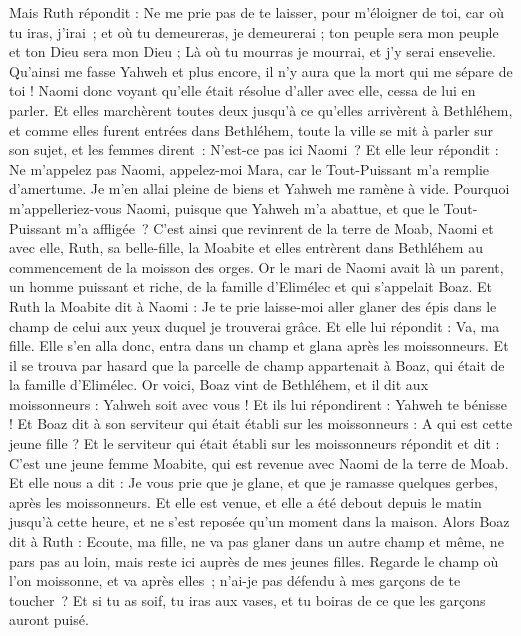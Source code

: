 \begin{multicols}{2}
Mais Ruth répondit : Ne me prie pas de te laisser, pour m’éloigner de toi, car où tu iras, j’irai ; et où tu demeureras, je demeurerai ; ton peuple sera mon peuple et ton Dieu sera mon Dieu ;
Là où tu mourras je mourrai, et j'y serai ensevelie. Qu'ainsi me fasse Yahweh et plus encore, il n’y aura que la mort qui me sépare de toi !
Naomi donc voyant qu’elle était résolue d’aller avec elle, cessa de lui en parler.
Et elles marchèrent toutes deux jusqu'à ce qu'elles arrivèrent à Bethléhem, et comme elles furent entrées dans Bethléhem, toute la ville se mit à parler sur son sujet, et les femmes dirent : N’est-ce pas ici Naomi ?
Et elle leur répondit : Ne m'appelez pas Naomi, appelez-moi Mara, car le Tout-Puissant m'a remplie d'amertume.
Je m’en allai pleine de biens et Yahweh me ramène à vide. Pourquoi m'appelleriez-vous Naomi, puisque que Yahweh m’a abattue, et que le Tout-Puissant m’a affligée ?
C'est ainsi que revinrent de la terre de Moab, Naomi et avec elle, Ruth, sa belle-fille, la Moabite et elles entrèrent dans Bethléhem au commencement de la moisson des orges.
\VerseOne{}Or le mari de Naomi avait là un parent, un homme puissant et riche, de la famille d'Elimélec et qui s'appelait Boaz.
Et Ruth la Moabite dit à Naomi : Je te prie laisse-moi aller glaner des épis dans le champ de celui aux yeux duquel je trouverai grâce. Et elle lui répondit : Va, ma fille.
Elle s'en alla donc, entra dans un champ et glana après les moissonneurs. Et il se trouva par hasard que la parcelle de champ appartenait à Boaz, qui était de la famille d'Elimélec.
Or voici, Boaz vint de Bethléhem, et il dit aux moissonneurs : Yahweh soit avec vous ! Et ils lui répondirent : Yahweh te bénisse !
Et Boaz dit à son serviteur qui était établi sur les moissonneurs : A qui est cette jeune fille ?
Et le serviteur qui était établi sur les moissonneurs répondit et dit : C'est une jeune femme Moabite, qui est revenue avec Naomi de la terre de Moab.
Et elle nous a dit : Je vous prie que je glane, et que je ramasse quelques gerbes, après les moissonneurs. Et elle est venue, et elle a été debout depuis le matin jusqu'à cette heure, et ne s'est reposée qu'un moment dans la maison.
Alors Boaz dit à Ruth : Ecoute, ma fille, ne va pas glaner dans un autre champ et même, ne pars pas au loin, mais reste ici auprès de mes jeunes filles.
Regarde le champ où l’on moissonne, et va après elles ; n’ai-je pas défendu à mes garçons de te toucher ? Et si tu as soif, tu iras aux vases, et tu boiras de ce que les garçons auront puisé.

\end{multicols}
